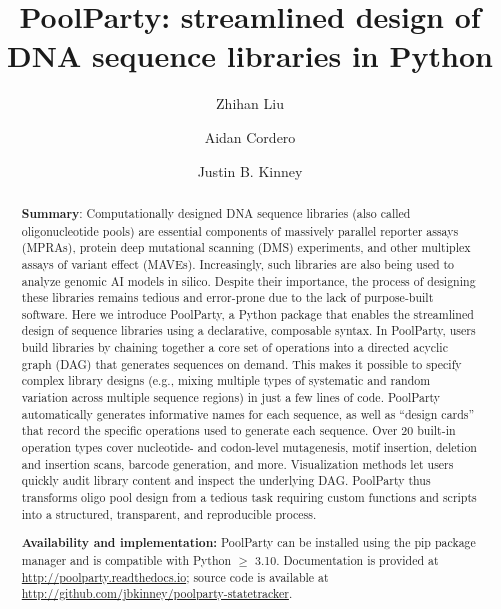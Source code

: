 \documentclass[twoside]{kinney_lab_preprintstyle}
\begin{document}
\raggedbottom
{}


\title{PoolParty: streamlined design of DNA sequence libraries in Python}

\author[1]{Zhihan Liu}
\author[1]{Aidan Cordero}
\author[1,\Letter]{Justin B. Kinney}


\begin{abstract}
\textbf{Summary}: Computationally designed DNA sequence libraries (also called oligonucleotide pools) are essential components of massively parallel reporter assays (MPRAs), protein deep mutational scanning (DMS) experiments, and other multiplex assays of variant effect (MAVEs). Increasingly, such libraries are also being used to analyze genomic AI models in silico. Despite their importance, the process of designing these libraries remains tedious and error-prone due to the lack of purpose-built software. Here we introduce PoolParty, a Python package that enables the streamlined design of sequence libraries using a declarative, composable syntax. In PoolParty, users build libraries by chaining together a core set of operations into a directed acyclic graph (DAG) that generates sequences on demand. This makes it possible to specify complex library designs (e.g., mixing multiple types of systematic and random variation across multiple sequence regions) in just a few lines of code. PoolParty automatically generates informative names for each sequence, as well as ``design cards'' that record the specific operations used to generate each sequence. Over 20 built-in operation types cover nucleotide- and codon-level mutagenesis, motif insertion, deletion and insertion scans, barcode generation, and more. Visualization methods let users quickly audit library content and inspect the underlying DAG. PoolParty thus transforms oligo pool design from a tedious task requiring custom functions and scripts into a structured, transparent, and reproducible process. 

\textbf{Availability and implementation:} PoolParty can be installed using the pip package manager and is compatible with Python $\geq$ 3.10. Documentation is provided at \url{http://poolparty.readthedocs.io}; source code is available at \url{http://github.com/jbkinney/poolparty-statetracker}.

\end{abstract}
\end{document}
